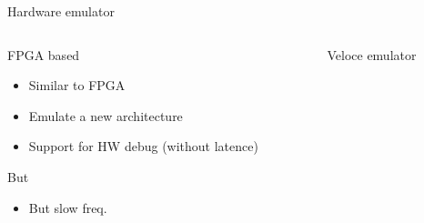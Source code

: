 %
\begin{Frame}{Hardware emulator}
  \begin{columns}[t]
    \begin{column}{5cm} %
      \begin{block}{FPGA based}
        \begin{itemize}
        \item Similar to FPGA
        \item Emulate a new architecture
        \item Support for HW debug (without latence)
        \end{itemize}
      \end{block}
      \begin{alertblock}{But}
        \begin{itemize}
        \item But slow freq.
        \end{itemize}
      \end{alertblock}
    \end{column}
    
    \begin{column}{5cm} %
      \begin{block}{Veloce emulator}
      \end{block}   
    \end{column}
  \end{columns}  
\end{Frame}


